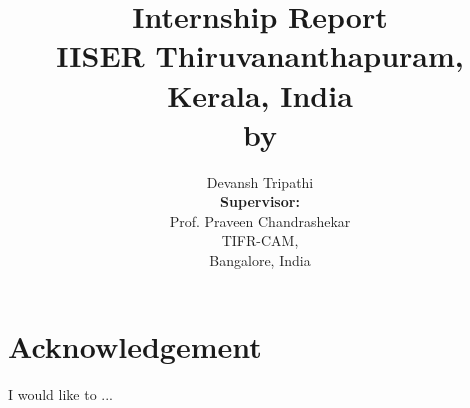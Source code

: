 \documentclass[12pt]{report}
\title{
{\textbf{Internship Report}}\\
{\large IISER Thiruvananthapuram,}\\{\large Kerala, India}\\{\small by}
}
\author{Devansh Tripathi\\ [1 cm]{\textbf{Supervisor:}}\\{ Prof. Praveen Chandrashekar}\\{TIFR-CAM,}\\{Bangalore, India}}
\date{}
\begin{document}
\maketitle
\chapter*{Acknowledgement}
I would like to ...
\tableofcontents
\end{document}
